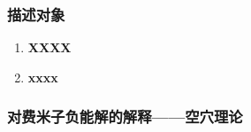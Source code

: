\subsubsection{描述对象}
\begin{enumerate}
\item \textbf{XXXX}
\item \textbf{xxxx}
\end{enumerate}
\subsubsection{对费米子负能解的解释——空穴理论}



